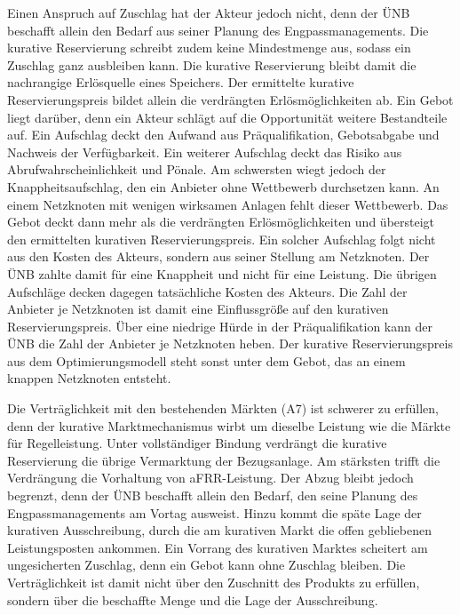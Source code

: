 Einen Anspruch auf Zuschlag hat der Akteur jedoch nicht, denn der \ac{ÜNB} beschafft allein den Bedarf aus seiner Planung des Engpassmanagements.
Die kurative Reservierung schreibt zudem keine Mindestmenge aus, sodass ein Zuschlag ganz ausbleiben kann.
Die kurative Reservierung bleibt damit die nachrangige Erlösquelle eines Speichers.
Der ermittelte kurative Reservierungspreis bildet allein die verdrängten Erlösmöglichkeiten ab.
Ein Gebot liegt darüber, denn ein Akteur schlägt auf die Opportunität weitere Bestandteile auf.
Ein Aufschlag deckt den Aufwand aus Präqualifikation, Gebotsabgabe und Nachweis der Verfügbarkeit.
Ein weiterer Aufschlag deckt das Risiko aus Abrufwahrscheinlichkeit und Pönale.
Am schwersten wiegt jedoch der Knappheitsaufschlag, den ein Anbieter ohne Wettbewerb durchsetzen kann.
An einem Netzknoten mit wenigen wirksamen Anlagen fehlt dieser Wettbewerb.
Das Gebot deckt dann mehr als die verdrängten Erlösmöglichkeiten und übersteigt den ermittelten kurativen Reservierungspreis.
Ein solcher Aufschlag folgt nicht aus den Kosten des Akteurs, sondern aus seiner Stellung am Netzknoten.
Der \ac{ÜNB} zahlte damit für eine Knappheit und nicht für eine Leistung.
Die übrigen Aufschläge decken dagegen tatsächliche Kosten des Akteurs.
Die Zahl der Anbieter je Netzknoten ist damit eine Einflussgröße auf den kurativen Reservierungspreis.
Über eine niedrige Hürde in der Präqualifikation kann der \ac{ÜNB} die Zahl der Anbieter je Netzknoten heben.
Der kurative Reservierungspreis aus dem Optimierungsmodell steht sonst unter dem Gebot, das an einem knappen Netzknoten entsteht.

Die Verträglichkeit mit den bestehenden Märkten (A7) ist schwerer zu erfüllen, denn der kurative Marktmechanismus wirbt um dieselbe Leistung wie die Märkte für Regelleistung.
Unter vollständiger Bindung verdrängt die kurative Reservierung die übrige Vermarktung der Bezugsanlage.
Am stärksten trifft die Verdrängung die Vorhaltung von \ac{aFRR}-Leistung.
Der Abzug bleibt jedoch begrenzt, denn der \ac{ÜNB} beschafft allein den Bedarf, den seine Planung des Engpassmanagements am Vortag ausweist.
Hinzu kommt die späte Lage der kurativen Ausschreibung, durch die am kurativen Markt die offen gebliebenen Leistungsposten ankommen.
Ein Vorrang des kurativen Marktes scheitert am ungesicherten Zuschlag, denn ein Gebot kann ohne Zuschlag bleiben.
Die Verträglichkeit ist damit nicht über den Zuschnitt des Produkts zu erfüllen, sondern über die beschaffte Menge und die Lage der Ausschreibung.

